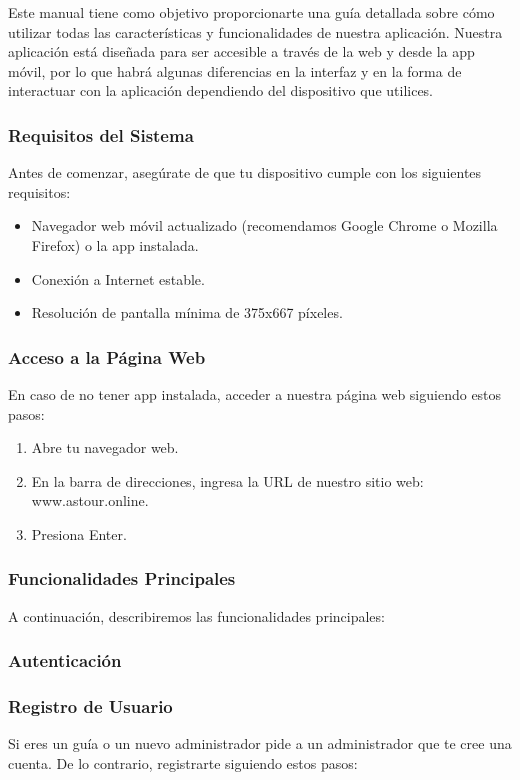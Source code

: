 Este manual tiene como objetivo proporcionarte una guía detallada sobre cómo utilizar todas las características y funcionalidades de nuestra aplicación.
Nuestra aplicación está diseñada para ser accesible a través de la web y desde la app móvil, por lo que habrá algunas diferencias en la interfaz y en la forma de interactuar con la aplicación dependiendo del dispositivo que utilices.

\subsubsection{Requisitos del Sistema}
Antes de comenzar, asegúrate de que tu dispositivo cumple con los siguientes requisitos:

\begin{itemize}
	\item Navegador web móvil actualizado (recomendamos Google Chrome o Mozilla Firefox) o la app instalada.
	\item Conexión a Internet estable.
	\item Resolución de pantalla mínima de 375x667 píxeles.
\end{itemize}

\subsubsection{Acceso a la Página Web}
En caso de no tener app instalada, acceder a nuestra página web siguiendo estos pasos:

\begin{enumerate}
	\item Abre tu navegador web.
	\item En la barra de direcciones, ingresa la URL de nuestro sitio web: www.astour.online.
	\item Presiona Enter.
\end{enumerate}

\subsubsection{Funcionalidades Principales}
A continuación, describiremos las funcionalidades principales:

\subsubsection{Autenticación}
\hrulefill
\subsubsection{Registro de Usuario}
Si eres un guía o un nuevo administrador pide a un administrador que te cree una cuenta.
De lo contrario, registrarte siguiendo estos pasos:

